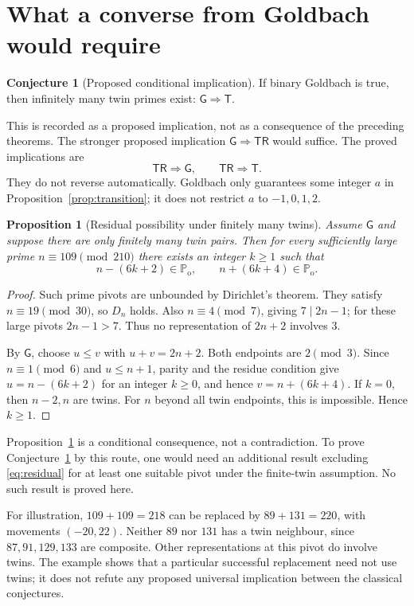 \documentclass[11pt,a4paper]{article}
\newtheorem{proposition}[theorem]{Proposition}
\theoremstyle{definition}
\newtheorem{conjecture}[theorem]{Conjecture}
\theoremstyle{remark}
\newcommand{\Po}{\mathbb P_{\mathrm{o}}}
\newcommand{\TR}{\mathsf{TR}}
\newcommand{\GB}{\mathsf G}
\newcommand{\TP}{\mathsf T}
\begin{document}
\section{What a converse from Goldbach would require}
\begin{conjecture}[Proposed conditional implication]\label{conj:GT}
If binary Goldbach is true, then infinitely many twin primes exist: $\GB\Rightarrow\TP$.
\end{conjecture}
This is recorded as a proposed implication, not as a consequence of the preceding theorems. The stronger proposed implication $\GB\Rightarrow\TR$ would suffice. The proved implications are
\[
 \TR\Rightarrow\GB,\qquad \TR\Rightarrow\TP.
\]
They do not reverse automatically. Goldbach only guarantees some integer $a$ in Proposition~\ref{prop:transition}; it does not restrict $a$ to $-1,0,1,2$.

\begin{proposition}[Residual possibility under finitely many twins]\label{prop:residual}
Assume $\GB$ and suppose there are only finitely many twin pairs. Then for every sufficiently large prime $n\equiv109\pmod{210}$ there exists an integer $k\ge1$ such that
\begin{equation}\label{eq:residual}
 n-(6k+2)\in\Po,\qquad n+(6k+4)\in\Po.
\end{equation}
\end{proposition}
\begin{proof}
Such prime pivots are unbounded by Dirichlet's theorem. They satisfy $n\equiv19\pmod{30}$, so $D_n$ holds. Also $n\equiv4\pmod7$, giving $7\mid2n-1$; for these large pivots $2n-1>7$. Thus no representation of $2n+2$ involves $3$.

By $\GB$, choose $u\le v$ with $u+v=2n+2$. Both endpoints are $2\pmod3$. Since $n\equiv1\pmod6$ and $u\le n+1$, parity and the residue condition give $u=n-(6k+2)$ for an integer $k\ge0$, and hence $v=n+(6k+4)$. If $k=0$, then $n-2,n$ are twins. For $n$ beyond all twin endpoints, this is impossible. Hence $k\ge1$.
\end{proof}

Proposition~\ref{prop:residual} is a conditional consequence, not a contradiction. To prove Conjecture~\ref{conj:GT} by this route, one would need an additional result excluding \eqref{eq:residual} for at least one suitable pivot under the finite-twin assumption. No such result is proved here.

For illustration, $109+109=218$ can be replaced by $89+131=220$, with movements $(-20,22)$. Neither $89$ nor $131$ has a twin neighbour, since $87,91,129,133$ are composite. Other representations at this pivot do involve twins. The example shows that a particular successful replacement need not use twins; it does not refute any proposed universal implication between the classical conjectures.
\end{document}
